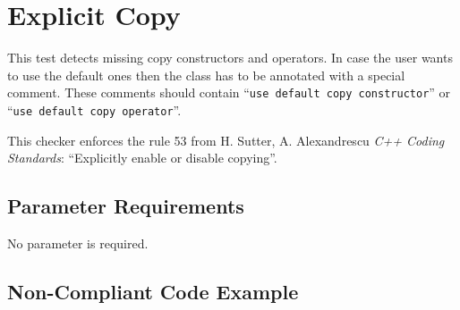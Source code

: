 %
%

\section{Explicit Copy}

\label{ExplicitCopy::overview}

   This test detects missing copy constructors and operators. In case
the user wants to use the default ones then the class has to be
annotated with a special comment. These comments should contain
``\texttt{use default copy constructor}'' or ``\texttt{use default
copy operator}''.

This checker enforces the rule 53 from H. Sutter, A. Alexandrescu
\emph{C++ Coding Standards}: ``Explicitly enable or disable copying''.


\subsection{Parameter Requirements}

   No parameter is required.

\subsection{Non-Compliant Code Example}

